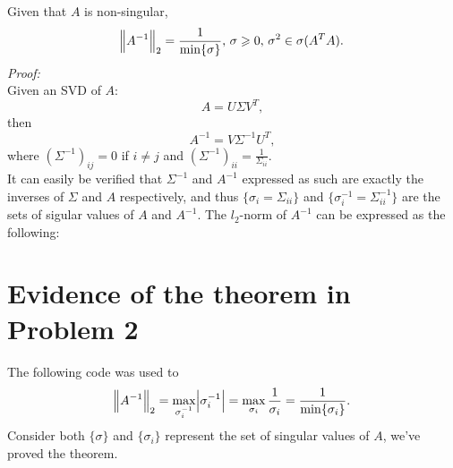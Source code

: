 \documentclass[11pt]{article}
\begin{document}
\subsection{}
Given that $A$ is non-singular, 
$$\norm{A^{-1}}_2 =\frac1{\min\{\sigma\}},\,\sigma \geqslant 0, \,\sigma^2\in\sigma(A^TA).$$
\textit{Proof:}\\[0.3cm]
Given an SVD of $A$:
$$A = U\Sigma V^T,$$ then
$$A^{-1} = V\Sigma^{-1}U^T,$$
where $(\Sigma^{-1})_{ij} = 0$ if $i\neq j$ and $(\Sigma^{-1})_{ii} = \frac1{\Sigma_{ii}}$.\\[0.3cm]
It can easily be verified that $\Sigma^{-1}$ and $A^{-1}$ expressed as such are exactly the inverses of $\Sigma$ and $A$ respectively, and thus $\{\sigma_i = \Sigma_{ii}\}$ and $\{\sigma^{-1}_i = \Sigma^{-1}_{ii}\}$ are the sets of sigular values of $A$ and $A^{-1}$. The $l_2$-norm of $A^{-1}$ can be expressed as the following:
\section{Evidence of the theorem in Problem 2}
The following code was used to 
$$\norm{A^{-1}}_2 = \max_{\sigma_i^{-1}}{\abs{\sigma^{-1}_i}} = \max_{\sigma_i}\frac1{\sigma_i}=\frac1{\min\{\sigma_i\}}.$$
Consider both $\{\sigma\}$ and $\{\sigma_i\}$ represent the set of singular values of $A$, we've proved the theorem.
\end{document}
